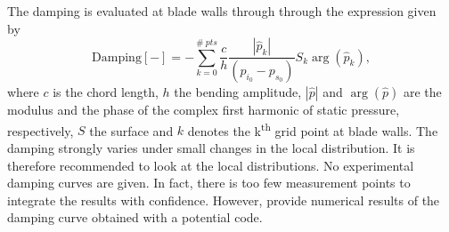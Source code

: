 The damping is evaluated at blade walls through through the
expression given by~\citet{Fransson1999}
\begin{equation}
    \textrm{Damping} [-] = - \sum^{\#~pts}_{k=0} \frac{c}{h} 
      \frac{|\widehat{p}_k|}{(p_{i_0} - p_{s_0})} S_k \arg (\widehat{p}_k),
\end{equation}
where $c$ is the chord length,
$h$ the bending amplitude, $| \widehat{p} |$ 
and $\arg (\widehat{p})$ are the modulus and the phase of the
complex first harmonic of static pressure, respectively, $S$ the surface
and $k$ denotes the k\textsuperscript{th}
grid point at blade walls.
The damping strongly varies under small changes in the
local distribution. It is therefore recommended to look at the local
distributions. No experimental damping curves are given. In fact,
there is too few measurement points to integrate the results with
confidence. However, \citet{Fransson1999}
provide numerical results of the damping curve obtained with a potential code.

